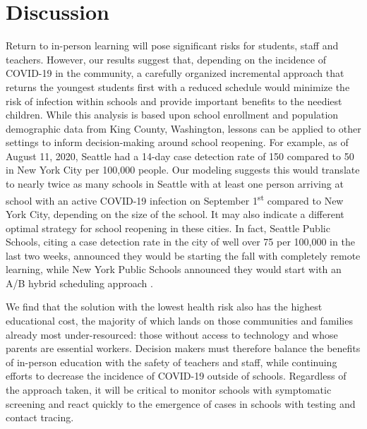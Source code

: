 \documentclass[preprint,12pt]{elsarticle}
\begin{document}
\section{Discussion}

Return to in-person learning will pose significant risks for students, staff and teachers. However, our results suggest that, depending on the incidence of COVID-19 in the community, a carefully organized incremental approach that returns the youngest students first with a reduced schedule would minimize the risk of infection within schools and provide important benefits to the neediest children. While this analysis is based upon school enrollment and population demographic data from King County, Washington, lessons can be applied to other settings to inform decision-making around school reopening. For example, as of August 11, 2020, Seattle had a 14-day case detection rate of 150 compared to 50 in New York City per 100,000 people. Our modeling suggests this would translate to nearly twice as many schools in Seattle with at least one person arriving at school with an active COVID-19 infection on September 1\textsuperscript{st} compared to New York City, depending on the size of the school. It may also indicate a different optimal strategy for school reopening in these cities. In fact, Seattle Public Schools, citing a case detection rate in the city of well over 75 per 100,000 in the last two weeks, announced they would be starting the fall with completely remote learning, while New York Public Schools announced they would start with an A/B hybrid scheduling approach \cite{zaveri_new_2020}.

We find that the solution with the lowest health risk also has the highest educational cost, the majority of which lands on those communities and families already most under-resourced: those without access to technology and whose parents are essential workers. Decision makers must therefore balance the benefits of in-person education with the safety of teachers and staff, while continuing efforts to decrease the incidence of COVID-19 outside of schools. Regardless of the approach taken, it will be critical to monitor schools with symptomatic screening and react quickly to the emergence of cases in schools with testing and contact tracing.
\end{document}
